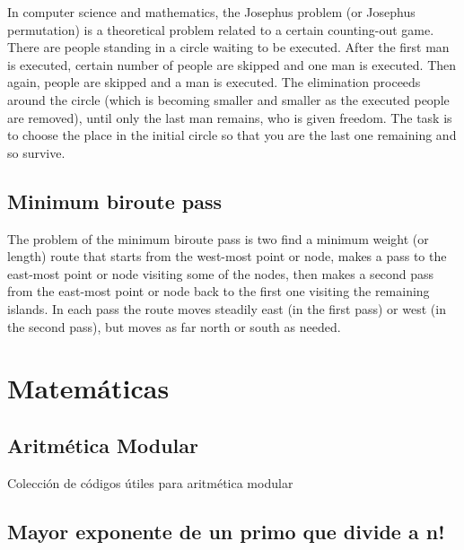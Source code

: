 \documentclass[10pt,letterpaper,twocolumn,twosided]{article}
\newcommand{\codigofuente}[1]{

\dotfill
}
\begin{document}
In computer science and mathematics, the Josephus problem (or Josephus permutation) is a theoretical problem related to a certain counting-out game.
There are people standing in a circle waiting to be executed. After the first man is executed, certain number of people are skipped and one man is executed. Then again, people are skipped and a man is executed. The elimination proceeds around the circle (which is becoming smaller and smaller as the executed people are removed), until only the last man remains, who is given freedom.
The task is to choose the place in the initial circle so that you are the last one remaining and so survive.

\codigofuente{src/dp/josephus.cpp}

\subsection{Minimum biroute pass}

The problem of the minimum biroute pass is two find a minimum weight (or length) route that starts from the west-most point or node, makes a pass to the east-most point or node visiting some of the nodes, then makes a second pass from the east-most point or node back to the first one visiting the remaining islands. In each pass the route moves steadily east (in the first pass) or west (in the second pass), but moves as far north or south as needed.

\codigofuente{src/dp/biroute.cpp}

\section{Matemáticas}



\subsection{Aritmética Modular}

Colección de códigos útiles para aritmética modular\\

\codigofuente{src/mate/euclidean.cpp}

\subsection{Mayor exponente de un primo que divide a n!}

\codigofuente{src/mate/pow_div.cpp}
\end{document}
